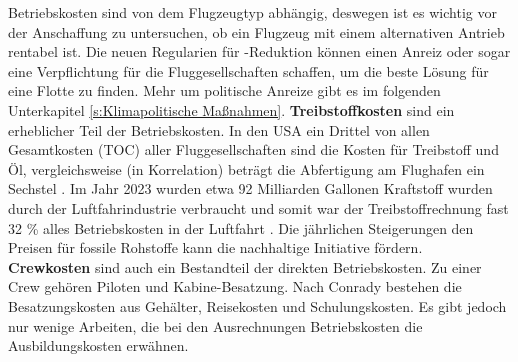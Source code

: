 Betriebskosten sind von dem Flugzeugtyp abhängig, deswegen ist es wichtig vor der Anschaffung zu untersuchen, 
ob ein Flugzeug mit einem alternativen Antrieb rentabel ist. Die neuen Regularien für -Reduktion können einen Anreiz oder sogar 
eine Verpflichtung für die Fluggesellschaften schaffen, um die beste Lösung für eine Flotte zu finden. 
Mehr um politische Anreize gibt es im folgenden Unterkapitel \ref{s:Klimapolitische Maßnahmen}.
%
\textbf{Treibstoffkosten} sind ein erheblicher Teil der Betriebskosten. In den USA ein Drittel von allen Gesamtkosten (TOC) aller 
Fluggesellschaften sind die Kosten für Treibstoff und Öl, vergleichsweise (in Korrelation) beträgt die Abfertigung am Flughafen ein Sechstel 
\cite{conrady2019luftverkehr}. 
Im Jahr 2023 wurden etwa 92 Milliarden Gallonen Kraftstoff wurden durch der Luftfahrindustrie verbraucht und somit
war der Treibstoffrechnung fast 32 \% alles Betriebskosten in der Luftfahrt \cite{iata_industry_statistics_2024}.
Die jährlichen Steigerungen den Preisen für fossile Rohstoffe kann die nachhaltige Initiative fördern. \\



\textbf{Crewkosten} sind auch ein Bestandteil der direkten Betriebskosten. Zu einer Crew gehören Piloten und Kabine-Besatzung.
Nach Conrady \cite{conrady2019luftverkehr} bestehen die Besatzungskosten aus Gehälter, Reisekosten und Schulungskosten.
Es gibt jedoch nur wenige Arbeiten, die bei den Ausrechnungen Betriebskosten die Ausbildungskosten erwähnen. 

